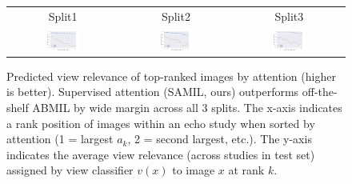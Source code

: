 \setlength{\tabcolsep}{0.1cm}
\begin{figure}
\begin{tabular}{c c c }
     Split1 & Split2 & Split3 
    \\
    \includegraphics[width=0.32\textwidth]{figures/Attention_View_Alignment/data_seed0.pdf}
    &
    \includegraphics[width=0.32\textwidth]{figures/Attention_View_Alignment/data_seed1.pdf}
    &
    \includegraphics[width=0.32\textwidth]{figures/Attention_View_Alignment/data_seed2.pdf}
    \end{tabular}	
    \caption{
    Predicted view relevance of top-ranked images by attention (higher is better).
    Supervised attention (SAMIL, ours) outperforms off-the-shelf ABMIL by wide margin across all 3 splits.
    The x-axis indicates a rank position of images within an echo study when sorted by attention (1 = largest $a_k$, 2 = second largest, etc.). The y-axis indicates the average view relevance (across studies in test set) assigned by view classifier $v(x)$ to image $x$ at rank $k$. 
     }
    \label{fig:Attention_View_Alignment}
\end{figure}
